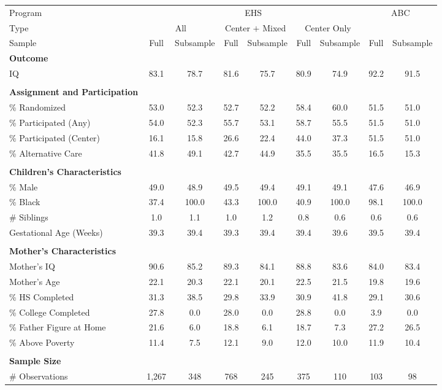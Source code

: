 \begin{tabular}{lcccccccc}
\toprule 
\midrule 
Program & \multicolumn{6}{c}{EHS} & \multicolumn{2}{c}{ABC} \\
 \cmidrule(lr){1-1} \cmidrule(lr){2-7} \cmidrule(lr){8-9} 
Type & \multicolumn{2}{c}{All} & \multicolumn{2}{c}{Center $+$ Mixed} & \multicolumn{2}{c}{Center Only} & \multicolumn{2}{c}{} \\
 \cmidrule(lr){1-1} \cmidrule(lr){2-3} \cmidrule(lr){4-5} \cmidrule(lr){6-7} \cmidrule(lr){8-9} 
Sample & Full & Subsample & Full & Subsample & Full & Subsample & Full & Subsample \\
\midrule 
\textbf{Outcome} \\
\quad IQ & 83.1 & 78.7 & 81.6 & 75.7 & 80.9 & 74.9 & 92.2 & 91.5 \\
 \\
\textbf{Assignment and Participation} \\
\quad \% Randomized & 53.0 & 52.3 & 52.7 & 52.2 & 58.4 & 60.0 & 51.5 & 51.0 \\
\quad \% Participated (Any) & 54.0 & 52.3 & 55.7 & 53.1 & 58.7 & 55.5 & 51.5 & 51.0 \\
\quad \% Participated (Center) & 16.1 & 15.8 & 26.6 & 22.4 & 44.0 & 37.3 & 51.5 & 51.0 \\
\quad \% Alternative Care & 41.8 & 49.1 & 42.7 & 44.9 & 35.5 & 35.5 & 16.5 & 15.3 \\
 \\
\textbf{Children's Characteristics} \\
\quad \% Male & 49.0 & 48.9 & 49.5 & 49.4 & 49.1 & 49.1 & 47.6 & 46.9 \\
\quad \% Black & 37.4 & 100.0 & 43.3 & 100.0 & 40.9 & 100.0 & 98.1 & 100.0 \\
\quad \# Siblings & 1.0 & 1.1 & 1.0 & 1.2 & 0.8 & 0.6 & 0.6 & 0.6 \\
\quad Gestational Age (Weeks) & 39.3 & 39.4 & 39.3 & 39.4 & 39.4 & 39.6 & 39.5 & 39.4 \\
 \\
\textbf{Mother's Characteristics} \\
\quad Mother's IQ & 90.6 & 85.2 & 89.3 & 84.1 & 88.8 & 83.6 & 84.0 & 83.4 \\
\quad Mother's Age & 22.1 & 20.3 & 22.1 & 20.1 & 22.5 & 21.5 & 19.8 & 19.6 \\
\quad \% HS Completed & 31.3 & 38.5 & 29.8 & 33.9 & 30.9 & 41.8 & 29.1 & 30.6 \\
\quad \% College Completed & 27.8 & 0.0 & 28.0 & 0.0 & 28.8 & 0.0 & 3.9 & 0.0 \\
\quad \% Father Figure at Home & 21.6 & 6.0 & 18.8 & 6.1 & 18.7 & 7.3 & 27.2 & 26.5 \\
\quad \% Above Poverty & 11.4 & 7.5 & 12.1 & 9.0 & 12.0 & 10.0 & 11.9 & 10.4 \\
 \\
\textbf{Sample Size} \\
\quad \# Observations & 1,267 & 348 & 768 & 245 & 375 & 110 & 103 & 98 \\
\midrule 
\bottomrule 
\end{tabular}
